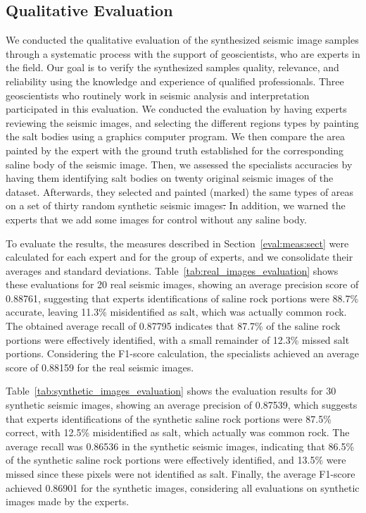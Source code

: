 ﻿\documentclass{ieeeaccess}
\makeatletter
\providecommand{\DIFaddtex}[1]{{\protect\color{blue}\uwave{#1}}} %
\providecommand{\DIFdeltex}[1]{{\protect\color{red}\sout{#1}}} %
\providecommand{\DIFaddbegin}{} %
\providecommand{\DIFaddend}{} %
\providecommand{\DIFdelbegin}{} %
\providecommand{\DIFdelend}{} %
\providecommand{\DIFadd}[1]{\texorpdfstring{\DIFaddtex{#1}}{#1}} %
\providecommand{\DIFdel}[1]{\texorpdfstring{\DIFdeltex{#1}}{}} %
\newcommand{\DIFscaledelfig}{0.5}
\newlength{\DIFdelgraphicswidth} %
\newlength{\DIFdelgraphicsheight} %
\newcommand{\DIFaddincludegraphics}[2][]{{\color{blue}\fbox{\DIFOincludegraphics[#1]{#2}}}} %
\newcommand{\DIFdelincludegraphics}[2][]{%
\sbox{\DIFdelgraphicsbox}{\DIFOincludegraphics[#1]{#2}}%
\settoboxwidth{\DIFdelgraphicswidth}{\DIFdelgraphicsbox} %
\settoboxtotalheight{\DIFdelgraphicsheight}{\DIFdelgraphicsbox} %
\scalebox{\DIFscaledelfig}{%
\parbox[b]{\DIFdelgraphicswidth}{\usebox{\DIFdelgraphicsbox}\\[-\baselineskip] \rule{\DIFdelgraphicswidth}{0em}}\llap{\resizebox{\DIFdelgraphicswidth}{\DIFdelgraphicsheight}{%
\setlength{\unitlength}{\DIFdelgraphicswidth}%
\begin{picture}(1,1)%
\thicklines\linethickness{2pt} %
{\color[rgb]{1,0,0}\put(0,0){\framebox(1,1){}}}%
{\color[rgb]{1,0,0}\put(0,0){\line( 1,1){1}}}%
{\color[rgb]{1,0,0}\put(0,1){\line(1,-1){1}}}%
\end{picture}%
}\hspace*{3pt}}} %
} %
\DeclareRobustCommand{\DIFaddbegin}{\DIFOaddbegin \let\includegraphics\DIFaddincludegraphics} %
\DeclareRobustCommand{\DIFaddend}{\DIFOaddend \let\includegraphics\DIFOincludegraphics} %
\DeclareRobustCommand{\DIFdelbegin}{\DIFOdelbegin \let\includegraphics\DIFdelincludegraphics} %
\DeclareRobustCommand{\DIFdelend}{\DIFOaddend \let\includegraphics\DIFOincludegraphics} %
\let\sout@orig\sout %
\renewcommand{\sout}[1]{\ifmmode\text{\sout@orig{\ensuremath{#1}}}\else\sout@orig{#1}\fi} %
\makeatother
\begin{document}
\subsection{Qualitative Evaluation}

We conducted the qualitative evaluation of the synthesized seismic image samples through a systematic process with the support of geoscientists, who are experts in the field. Our goal is to verify the synthesized samples quality, relevance, and reliability using the knowledge and experience of qualified professionals. Three geoscientists who routinely work in seismic analysis and interpretation participated in this evaluation. We conducted the evaluation by having experts reviewing the seismic images, and selecting the different regions types by painting the salt bodies using a graphics computer program. We then compare the area painted by the expert with the ground truth established for the corresponding saline body of the seismic image. Then, we assessed the specialists accuracies by having them identifying salt bodies on twenty original seismic images of the dataset. Afterwards, they selected and painted (marked) the same types of areas on a set of thirty random synthetic seismic images\DIFdelbegin \DIFdel{. }\DIFdelend \DIFaddbegin \DIFadd{, examples of which are shown in Fig.~\ref{fig:synthetic_samples}. }\DIFaddend In addition, we warned the experts that we add some images for control without any saline body.

To evaluate the results, the measures described in Section~\ref{eval:meas:sect} were calculated for each expert and for the group of experts, and we consolidate their averages and standard deviations. Table~\ref{tab:real_images_evaluation} shows these evaluations for 20 real seismic images, showing an average precision score of 0.88761, suggesting that experts identifications of saline rock portions were 88.7\% accurate, leaving 11.3\% misidentified as salt, which was actually common rock. The obtained average recall of 0.87795 indicates that 87.7\% of the saline rock portions were effectively identified, with a small remainder of 12.3\% missed salt portions. Considering the F1-score calculation, the specialists achieved an average score of 0.88159 for the real seismic images.

Table~\ref{tab:synthetic_images_evaluation} shows the evaluation  results for 30 synthetic seismic images, showing an average precision of 0.87539, which suggests that experts identifications of the synthetic saline rock portions were 87.5\% correct, with 12.5\% misidentified as salt, which actually was common rock. The average recall was 0.86536 in the synthetic seismic images, indicating that 86.5\% of the synthetic saline rock portions were effectively identified, and 13.5\% were missed since these pixels were not identified as salt. Finally, the average F1-score achieved 0.86901 for the synthetic images, considering all evaluations on synthetic images made by the experts.
\end{document}
